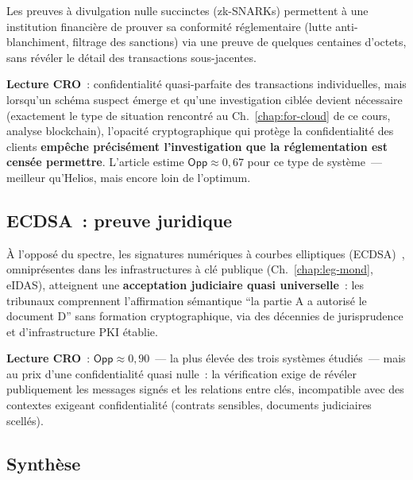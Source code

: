 Les preuves à divulgation nulle succinctes (zk-SNARKs) permettent
à une institution financière de prouver sa conformité réglementaire
(lutte anti-blanchiment, filtrage des sanctions) via une preuve
de quelques centaines d'octets, sans révéler le détail des
transactions sous-jacentes.

\textbf{Lecture CRO}~: confidentialité quasi-parfaite des
transactions individuelles, mais lorsqu'un schéma suspect émerge
et qu'une investigation ciblée devient nécessaire (exactement le
type de situation rencontré au Ch.~\ref{chap:for-cloud} de ce
cours, analyse blockchain), l'opacité cryptographique qui protège
la confidentialité des clients \textbf{empêche précisément
l'investigation que la réglementation est censée permettre}.
L'article estime $\mathsf{Opp} \approx 0{,}67$ pour ce type de
système~--- meilleur qu'Helios, mais encore loin de l'optimum.

\subsection{ECDSA~: preuve juridique}

À l'opposé du spectre, les signatures numériques à courbes
elliptiques (ECDSA)~\cite{johnson2001ecdsa}, omniprésentes dans
les infrastructures à clé publique (Ch.~\ref{chap:leg-mond},
eIDAS), atteignent une \textbf{acceptation judiciaire quasi
universelle}~: les tribunaux comprennent l'affirmation sémantique
``la partie A a autorisé le document D'' sans formation
cryptographique, via des décennies de jurisprudence et
d'infrastructure PKI établie.

\textbf{Lecture CRO}~: $\mathsf{Opp} \approx 0{,}90$~--- la plus
élevée des trois systèmes étudiés~--- mais au prix d'une
confidentialité quasi nulle~: la vérification exige de révéler
publiquement les messages signés et les relations entre clés,
incompatible avec des contextes exigeant confidentialité
(contrats sensibles, documents judiciaires scellés).

\subsection{Synthèse}

